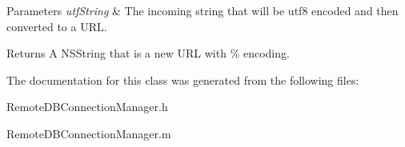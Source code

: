 \begin{DoxyParams}{Parameters}
{\em utf\-String} & The incoming string that will be utf8 encoded and then converted to a U\-R\-L.\\
\hline
\end{DoxyParams}
\begin{DoxyReturn}{Returns}
A N\-S\-String that is a new U\-R\-L with \% encoding. 
\end{DoxyReturn}


The documentation for this class was generated from the following files\-:\begin{DoxyCompactItemize}
\item 
Remote\-D\-B\-Connection\-Manager.\-h\item 
Remote\-D\-B\-Connection\-Manager.\-m\end{DoxyCompactItemize}
